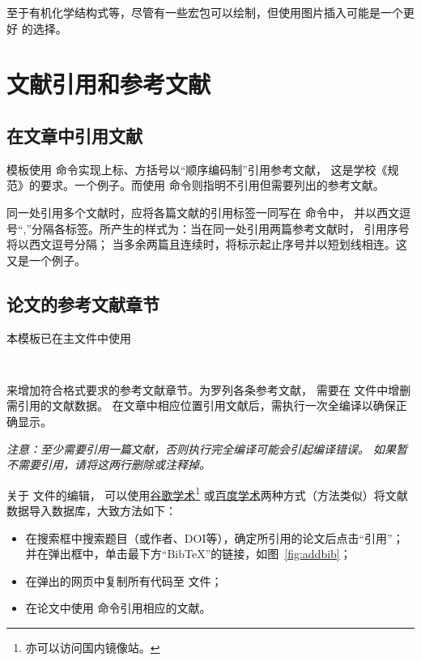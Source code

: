 至于有机化学结构式等，尽管有一些宏包可以绘制，但使用图片插入可能是一个更好
的选择。

\section{文献引用和参考文献}\label{sec:bib}
\subsection{在文章中引用文献}
模板使用 命令实现上标、方括号以“顺序编码制”引用参考文献，
这是学校《规范》的要求。一个例子。\cite{abbott2016observation}而使用
命令则指明不引用但需要列出的参考文献。\nocite{*}

同一处引用多个文献时，应将各篇文献的引用标签一同写在  命令中，
并以西文逗号“,”分隔各标签。所产生的样式为：当在同一处引用两篇参考文献时，
引用序号将以西文逗号分隔；
当多余两篇且连续时，将标示起止序号并以短划线相连。这\cite{texbook,latexrumen}
又是\cite{texbook,latexrumen,gbt7714-2005}一个例子。\cite{abbott2016observation,texbook,latexrumen,buctthesis}


\subsection{论文的参考文献章节}
本模板已在主文件中使用
\begin{lstlisting}[numbers=none]


	\end{lstlisting}
来增加符合格式要求的参考文献章节。为罗列各条参考文献，
需要在  文件中增删需引用的文献数据。
在文章中相应位置引用文献后，需执行一次全编译以确保正确显示。

\emph{注意：至少需要引用一篇文献，否则执行完全编译可能会引起编译错误。
如果暂不需要引用，请将这两行删除或注释掉。}

关于  文件的编辑，
可以使用\href{http://scholar.google.com.cn/}{谷歌学术}\footnote{亦可以访问国内镜像站。}%
或\href{http://xueshu.baidu.com}{百度学术}两种方式（方法类似）将文献数据导入\BibTeX{}数据库，大致方法如下：
\begin{itemize}
	\item 在搜索框中搜索题目（或作者、DOI等），确定所引用的论文后点击“引用”；并在弹出框中，单击最下方“BibTeX”的链接，如图~\ref{fig:addbib}；
	\item 在弹出的网页中复制所有代码至  文件；
	\item 在论文中使用 命令引用相应的文献。
\end{itemize}

